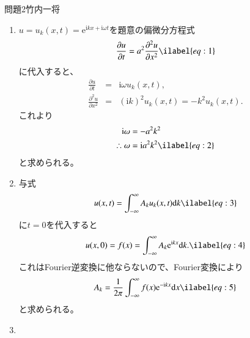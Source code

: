 \documentclass[fleqn]{jbook}
\newcommand{\prt}[2]{\frac{\partial #1}{\partial #2}}   %
\newcommand{\prts}[3]{\frac{\partial^{#3} #1}{\partial {#2}^{#3}}}   %
\begin{document}
\begin{answer}{問題2}{竹内一将}
\begin{enumerate}
\item

$u=u_k(x,t)=\mathrm{e}^{\mathrm{i} kx + \mathrm{i}\omega t}$を題意の偏微分方程式
\begin{eqnarray}
 \prt{u}{t} = a^2 \prts{u}{x}{2}  \ilabel{eq:1}
\end{eqnarray}
に代入すると、
\begin{eqnarray*}
 \prt{u}{t} &=& \mathrm{i}\omega u_k(x,t),  \\
 \prts{u}{x}{2} &=& (\mathrm{i} k)^2 u_k(x,t) = -k^2 u_k(x,t).
\end{eqnarray*}
これより
\begin{eqnarray}
 \mathrm{i} \omega &= -a^2 k^2  \notag \\
 \therefore \omega &= \mathrm{i} a^2 k^2  \ilabel{eq:2}
\end{eqnarray}
と求められる。

\item

与式
\begin{eqnarray}
 u(x,t) = \int_{-\infty}^\infty A_k u_k(x,t) \mathrm{d} k  \ilabel{eq:3}
\end{eqnarray}
に$t=0$を代入すると
\begin{eqnarray}
 u(x,0) = f(x) = \int_{-\infty}^\infty A_k \mathrm{e}^{\mathrm{i} kx} \mathrm{d} k.  \ilabel{eq:4}
\end{eqnarray}
これはFourier逆変換に他ならないので、Fourier変換により
\begin{eqnarray}
 A_k = \frac{1}{2\pi} \int_{-\infty}^\infty f(x) \mathrm{e}^{-\mathrm{i} kx} \mathrm{d} x
  \ilabel{eq:5}
\end{eqnarray}
と求められる。

\item


\end{enumerate}
\end{answer}
\end{document}
